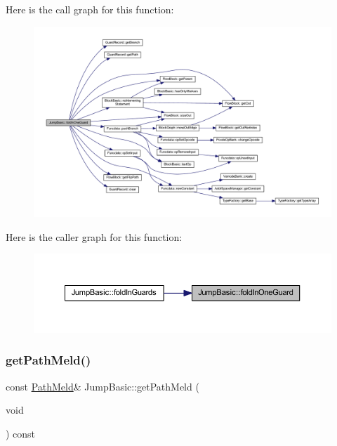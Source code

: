 Here is the call graph for this function\+:
\nopagebreak
\begin{figure}[H]
\begin{center}
\leavevmode
\includegraphics[width=350pt]{class_jump_basic_a27ac3c21abdfc602f857802a7479c6d4_cgraph}
\end{center}
\end{figure}
Here is the caller graph for this function\+:
\nopagebreak
\begin{figure}[H]
\begin{center}
\leavevmode
\includegraphics[width=350pt]{class_jump_basic_a27ac3c21abdfc602f857802a7479c6d4_icgraph}
\end{center}
\end{figure}
\mbox{\label{class_jump_basic_aa345cf2327b7e4214c1b7e81212b3ab1}} 
\subsubsection{\texorpdfstring{getPathMeld()}{getPathMeld()}}
{\footnotesize\ttfamily const \mbox{\hyperlink{class_path_meld}{Path\+Meld}}\& Jump\+Basic\+::get\+Path\+Meld (\begin{DoxyParamCaption}\item[{void}]{ }\end{DoxyParamCaption}) const\hspace{0.3cm}{\ttfamily [inline]}}



